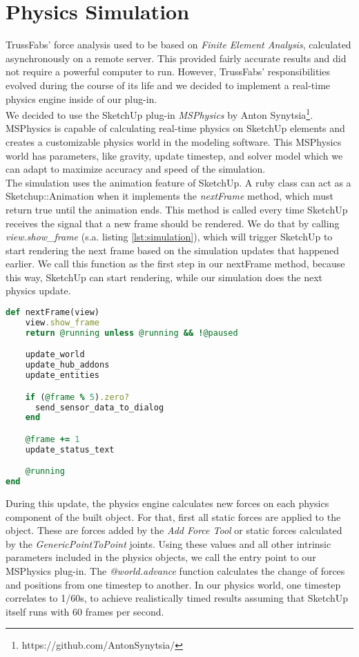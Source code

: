 \section{Physics Simulation}\label{sec:simulation}
TrussFabs' force analysis used to be based on \textit{Finite Element Analysis}, calculated asynchronously on a remote server. This provided fairly accurate results and did not require a powerful computer to run. However, TrussFabs' responsibilities evolved during the course of its life and we decided to implement a real-time physics engine inside of our plug-in.\\
We decided to use the SketchUp plug-in \textit{MSPhysics} by Anton Synytsia\footnote{https://github.com/AntonSynytsia/}. MSPhysics is capable of calculating real-time physics on SketchUp elements and creates a customizable physics world in the modeling software. This MSPhysics world has parameters, like gravity, update timestep, and solver model which we can adapt to maximize accuracy and speed of the simulation.\\
The simulation uses the animation feature of SketchUp. A ruby class can act as a Sketchup::Animation when it implements the \textit{nextFrame} method, which must return true until the animation ends. This method is called every time SketchUp receives the signal that a new frame should be rendered. We do that by calling \textit{view.show\_frame} (s.a. listing \ref{lst:simulation}), which will trigger SketchUp to start rendering the next frame based on the simulation updates that happened earlier. We call this function as the first step in our nextFrame method, because this way, SketchUp can start rendering, while our simulation does the next physics update.\\
\begin{lstlisting}[language=Ruby, label={lst:simulation}, caption=Simulation nextFrame method]
def nextFrame(view)
    view.show_frame
    return @running unless @running && !@paused

    update_world
    update_hub_addons
    update_entities

    if (@frame % 5).zero?
      send_sensor_data_to_dialog
    end

    @frame += 1
    update_status_text

    @running
end
\end{lstlisting}
During this update, the physics engine calculates new forces on each physics component of the built object. For that, first all static forces are applied to the object. These are forces added by the \textit{Add Force Tool} or static forces calculated by the \textit{GenericPointToPoint} joints. Using these values and all other intrinsic parameters included in the physics objects, we call the entry point to our MSPhysics plug-in. The \textit{@world.advance} function calculates the change of forces and positions from one timestep to another. In our physics world, one timestep correlates to 1/60s, to achieve realistically timed results assuming that SketchUp itself runs with 60 frames per second.\\

